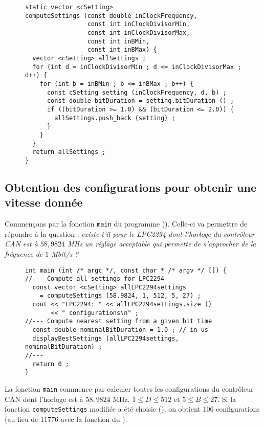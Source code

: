 \begin{figure}[!ht]
\begin{lstlisting}
static vector <cSetting>
computeSettings (const double inClockFrequency,
                 const int inClockDivisorMin,
                 const int inClockDivisorMax,
                 const int inBMin,
                 const int inBMax) {
  vector <cSetting> allSettings ;
  for (int d = inClockDivisorMin ; d <= inClockDivisorMax ; d++) {
    for (int b = inBMin ; b <= inBMax ; b++) {
      const cSetting setting (inClockFrequency, d, b) ;
      const double bitDuration = setting.bitDuration () ;
      if ((bitDuration >= 1.0) && (bitDuration <= 2.0)) {
        allSettings.push_back (setting) ;
      }
    }
  }
  return allSettings ;
}
\end{lstlisting}
\end{figure}



\subsection{Obtention des configurations pour obtenir une vitesse donnée}

Commençons par la fonction \texttt{main} du programme (). Celle-ci va permettre de répondre à la question : \emph{existe-t'il pour le LPC2294 dont l'horloge du contrôleur CAN est à $58,9824$ MHz un réglage acceptable qui permette de s'approcher de la fréquence de $1$ Mbit/s ?}


\begin{figure}[!ht]
\begin{lstlisting}
int main (int /* argc */, const char * /* argv */ []) {
//--- Compute all settings for LPC2294
  const vector <cSetting> allLPC2294settings
    = computeSettings (58.9824, 1, 512, 5, 27) ;
  cout << "LPC2294: " << allLPC2294settings.size ()
       << " configurations\n" ;
//--- Compute nearest setting from a given bit time
  const double nominalBitDuration = 1.0 ; // in us
  displayBestSettings (allLPC2294settings, nominalBitDuration) ;
//---
  return 0 ;
}
\end{lstlisting}
\end{figure}

La fonction \texttt{main} commence par calculer toutes les configurations du contrôleur CAN dont l'horloge est à $58,9824$ MHz, $1 \leqslant D \leqslant 512$ et $5 \leqslant B \leqslant 27$. Si la fonction \texttt{computeSettings} modifiée a été choisie (), on obtient $106$ configurations (au lieu de $11776$ avec la fonction du ).


